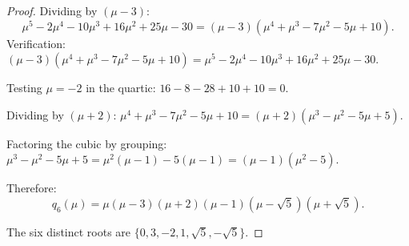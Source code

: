 \documentclass[11pt,a4paper]{article}
\theoremstyle{plain}
\theoremstyle{definition}
\begin{document}
\begin{proof}
Dividing by $(\mu - 3)$:
\[
  \mu^5 - 2\mu^4 - 10\mu^3 + 16\mu^2 + 25\mu - 30
  = (\mu - 3)(\mu^4 + \mu^3 - 7\mu^2 - 5\mu + 10).
\]
Verification: $(\mu - 3)(\mu^4 + \mu^3 - 7\mu^2 - 5\mu + 10)
= \mu^5 - 2\mu^4 - 10\mu^3 + 16\mu^2 + 25\mu - 30$. \checkmark

Testing $\mu = -2$ in the quartic: $16 - 8 - 28 + 10 + 10 = 0$. \checkmark

Dividing by $(\mu + 2)$:
$\mu^4 + \mu^3 - 7\mu^2 - 5\mu + 10 = (\mu + 2)(\mu^3 - \mu^2 - 5\mu + 5)$.

Factoring the cubic by grouping:
$\mu^3 - \mu^2 - 5\mu + 5 = \mu^2(\mu - 1) - 5(\mu - 1) = (\mu - 1)(\mu^2 - 5)$.

Therefore:
\begin{equation}\label{eq:q6-factored}
  q_6(\mu) = \mu(\mu - 3)(\mu + 2)(\mu - 1)(\mu - \sqrt{5})(\mu + \sqrt{5}).
\end{equation}

The six distinct roots are $\{0, 3, -2, 1, \sqrt{5}, -\sqrt{5}\}$.
\end{proof}
\end{document}
